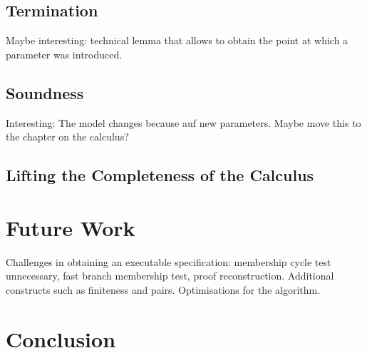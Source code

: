 \documentclass[sigplan,10pt,anonymous,review]{acmart}
\begin{document}
\subsection{Termination}
Maybe interesting: technical lemma that allows to obtain the point at which a parameter was introduced.
\subsection{Soundness}
Interesting: The model changes because auf new parameters.
Maybe move this to the chapter on the calculus?
\subsection{Lifting the Completeness of the Calculus}

\section{Future Work}
Challenges in obtaining an executable specification: membership cycle test unnecessary, fast branch membership test, proof reconstruction.
Additional constructs such as finiteness and pairs.
Optimisations for the algorithm.

\section{Conclusion}

\begin{acks}
\end{acks}



\end{document}
